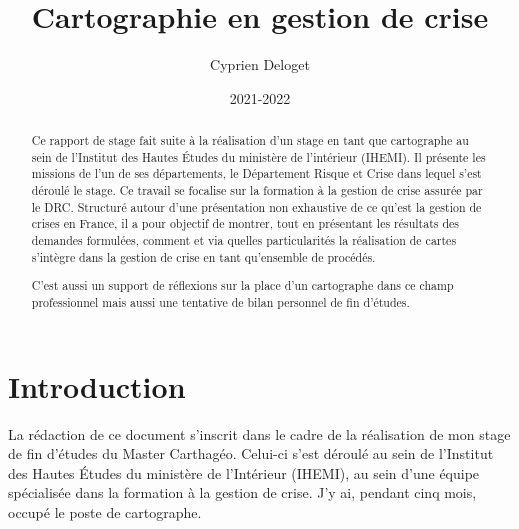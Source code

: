 \documentclass[10pt,a4paper]{report} %
\begin{document}

\title{Cartographie en gestion de crise}
\author{Cyprien Deloget}
\date{2021-2022}



\newpage
\thispagestyle{empty}
\mbox{}
\newpage


\begin{abstract}
    Ce rapport de stage fait suite à la réalisation d’un stage en tant que cartographe au sein de l’Institut des Hautes Études du ministère de l’intérieur (IHEMI). Il présente les missions de l’un de ses départements, le Département Risque et Crise dans lequel s’est déroulé le stage. Ce travail se focalise sur la formation à la gestion de crise assurée par le DRC. Structuré autour d’une présentation non exhaustive de ce qu’est la gestion de crises en France, il a pour objectif de montrer, tout en présentant les résultats des demandes formulées, comment et via quelles particularités la réalisation de cartes s’intègre dans la gestion de crise en tant qu’ensemble de procédés. 
    
    C’est aussi un support de réflexions sur la place d’un cartographe dans ce champ professionnel mais aussi une tentative de bilan personnel de fin d’études.
\end{abstract}


\tableofcontents{}

\newpage
\thispagestyle{empty}
\mbox{}
\newpage



\part*{Introduction}

La rédaction de ce document s’inscrit dans le cadre de la réalisation de mon stage de fin d’études du Master Carthagéo. Celui-ci s’est déroulé au sein de l’Institut des Hautes Études du ministère de l’Intérieur (IHEMI), au sein d’une équipe spécialisée dans la formation à la gestion de crise. J’y ai, pendant cinq mois, occupé le poste de cartographe. 
\end{document}
